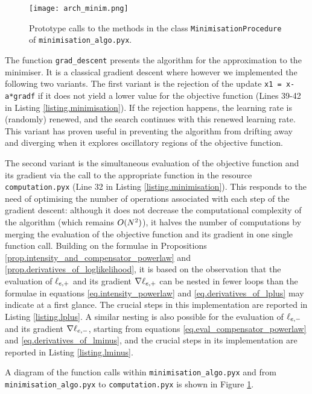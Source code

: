 \documentclass[10pt, article,table]{article}
\begin{document}
\begin{figure}
\centering
 \texttt{[image: arch\_minim.png]}
 \caption{Prototype calls to the methods in the class \texttt{MinimisationProcedure} of \texttt{minimisation\_algo.pyx}.}
 \label{fig.callgraph_minim}
\end{figure}

The function \texttt{grad\_descent} presents the algorithm for the approximation to the minimiser. It is a classical gradient descent where however we implemented the following two variants. The first variant is the rejection of the update \texttt{x1 = x-a*gradf} if it does not yield a lower value for the objective function (Lines 39-42 in Listing \ref{listing.minimisation}). If the rejection happens, the learning rate is (randomly) renewed, and the search continues with this renewed learning rate. This variant has proven useful in preventing the algorithm from drifting away and diverging when it explores oscillatory regions of the objective function.

The second variant is the simultaneous evaluation of the objective function and its gradient via the call to the appropriate function in the resource \texttt{computation.pyx} (Line 32 in Listing \ref{listing.minimisation}). This responds to the need of optimising the number of operations associated with each step of the gradient descent: although it does not decrease the computational complexity of the algorithm (which remains $O(N\squared)$), it halves the number of computations by merging the evaluation of the objective function and its gradient in one single function call. Building on the formulae in Propositions \ref{prop.intensity_and_compensator_powerlaw} and \ref{prop.derivatives_of_loglikelihood}, it is based on the observation that the evaluation of  $\leplus$ and its gradient $\nabla \leplus$ can be nested in fewer loops than the formulae in equations \eqref{eq.intensity_powerlaw} and \eqref{eq.derivatives_of_lplus} may indicate at a first glance. The crucial steps in this implementation are reported in Listing \ref{listing.lplus}. A similar nesting is also possible for the  evaluation of  $\leminus$ and its gradient $\nabla \leminus$, starting from equations \eqref{eq.eval_compensator_powerlaw} and \eqref{eq.derivatives_of_lminus}, and the crucial steps in its implementation are reported in Listing \ref{listing.lminus}.

A diagram of the function calls within \texttt{minimisation\_algo.pyx} and from \texttt{minimisation\_algo.pyx} to \texttt{computation.pyx} is shown in Figure \ref{fig.callgraph_minim}. 
\end{document}
